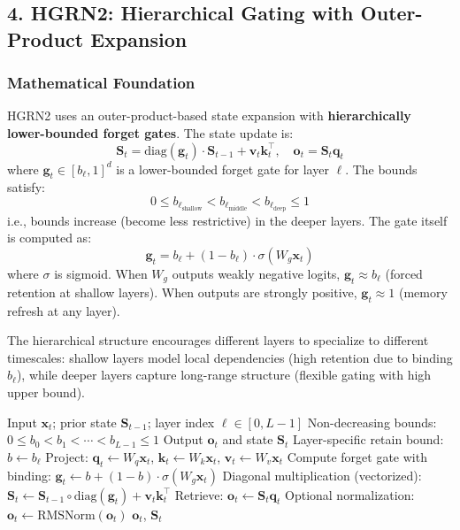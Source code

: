 \subsection{4. HGRN2: Hierarchical Gating with Outer-Product Expansion}

\subsubsection{Mathematical Foundation}

HGRN2 \citep{qin_hgrn2_2024} uses an outer-product-based state expansion with \textbf{hierarchically lower-bounded forget gates}. The state update is:
\[
\mathbf{S}_t = \text{diag}(\mathbf{g}_t) \cdot \mathbf{S}_{t-1} + \mathbf{v}_t \mathbf{k}_t^\top, \quad \mathbf{o}_t = \mathbf{S}_t \mathbf{q}_t
\]
where $\mathbf{g}_t \in [b_\ell, 1]^d$ is a lower-bounded forget gate for layer $\ell$. The bounds satisfy:
\[
0 \le b_{\ell_{\text{shallow}}} < b_{\ell_{\text{middle}}} < b_{\ell_{\text{deep}}} \le 1
\]
i.e., bounds increase (become less restrictive) in the deeper layers. The gate itself is computed as:
\[
\mathbf{g}_t = b_\ell + (1 - b_\ell) \cdot \sigma(W_g \mathbf{x}_t)
\]
where $\sigma$ is sigmoid. When $W_g$ outputs weakly negative logits, $\mathbf{g}_t \approx b_\ell$ (forced retention at shallow layers). When outputs are strongly positive, $\mathbf{g}_t \approx 1$ (memory refresh at any layer).

The hierarchical structure encourages different layers to specialize to different timescales: shallow layers model local dependencies (high retention due to binding $b_\ell$), while deeper layers capture long-range structure (flexible gating with high upper bound).

\begin{algorithm}[H]
\caption{HGRN2 Forward with Hierarchical Bounds}
\begin{algorithmic}[1]
\Require Input $\mathbf{x}_t$; prior state $\mathbf{S}_{t-1}$; layer index $\ell \in [0, L-1]$
\Require Non-decreasing bounds: $0 \le b_0 < b_1 < \cdots < b_{L-1} \le 1$
\Ensure Output $\mathbf{o}_t$ and state $\mathbf{S}_t$
\State Layer-specific retain bound: $b \gets b_\ell$
\State Project: $\mathbf{q}_t \gets W_q \mathbf{x}_t$, $\mathbf{k}_t \gets W_k \mathbf{x}_t$, $\mathbf{v}_t \gets W_v \mathbf{x}_t$
\State Compute forget gate with binding: $\mathbf{g}_t \gets b + (1-b) \cdot \sigma(W_g \mathbf{x}_t)$ 
\State Diagonal multiplication (vectorized): $\mathbf{S}_t \gets \mathbf{S}_{t-1} \circ \text{diag}(\mathbf{g}_t) + \mathbf{v}_t \mathbf{k}_t^\top$
\State Retrieve: $\mathbf{o}_t \gets \mathbf{S}_t \mathbf{q}_t$
\State Optional normalization: $\mathbf{o}_t \gets \text{RMSNorm}(\mathbf{o}_t)$
\Return $\mathbf{o}_t$, $\mathbf{S}_t$
\end{algorithmic}
\end{algorithm}

